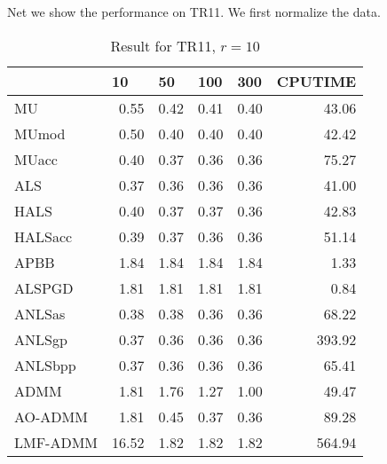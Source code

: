 \documentclass{article}
\begin{document}
Net we show the performance on TR11. We first normalize the data.
\begin{table}[H]
	\caption{Result for TR11, $r = 10$}
	\centering
	
	\begin{tabular}{|l|r|r|r|r|r|}
		\hline
		& \multicolumn{1}{l|}{10} & \multicolumn{1}{l|}{50} & \multicolumn{1}{l|}{100} & \multicolumn{1}{l|}{300} & \multicolumn{1}{l|}{CPUTIME} \\ \hline
		MU       & 0.55                    & 0.42                    & 0.41                     & 0.40                     & 43.06                        \\ \hline
		MUmod    & 0.50                    & 0.40                    & 0.40                     & 0.40                     & 42.42                        \\ \hline
		MUacc    & 0.40                    & 0.37                    & 0.36                     & 0.36                     & 75.27                        \\ \hline
		ALS      & 0.37                    & 0.36                    & 0.36                     & 0.36                     & 41.00                        \\ \hline
		HALS     & 0.40                    & 0.37                    & 0.37                     & 0.36                     & 42.83                        \\ \hline
		HALSacc  & 0.39                    & 0.37                    & 0.36                     & 0.36                     & 51.14                        \\ \hline
		APBB     & 1.84                    & 1.84                    & 1.84                     & 1.84                     & 1.33                         \\ \hline
		ALSPGD   & 1.81                    & 1.81                    & 1.81                     & 1.81                     & 0.84                         \\ \hline
		ANLSas   & 0.38                    & 0.38                    & 0.36                     & 0.36                     & 68.22                        \\ \hline
		ANLSgp   & 0.37                    & 0.36                    & 0.36                     & 0.36                     & 393.92                       \\ \hline
		ANLSbpp  & 0.37                    & 0.36                    & 0.36                     & 0.36                     & 65.41                        \\ \hline
		ADMM     & 1.81                    & 1.76                    & 1.27                     & 1.00                     & 49.47                        \\ \hline
		AO-ADMM  & 1.81                    & 0.45                    & 0.37                     & 0.36                     & 89.28                        \\ \hline
		LMF-ADMM & 16.52                   & 1.82                    & 1.82                     & 1.82                     & 564.94                       \\ \hline
	\end{tabular}
\end{table}
\end{document}
